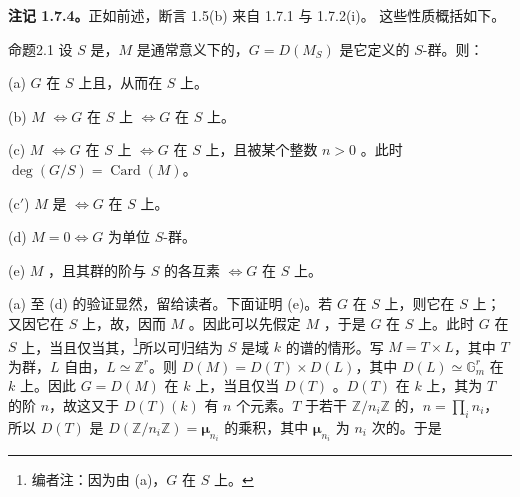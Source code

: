 \textbf{注记 1.7.4。}正如前述，断言 1.5(b) 来自 1.7.1 与 1.7.2(i)。
这些性质概括如下。
\begin{SGAresult}{命题}{2.1}
设 $S$ 是，$M$ 是通常意义下的，$G=D(M_S)$ 是它定义的 $S$-群。则：

(a) $G$ 在 $S$ 上且，从而在 $S$ 上。

(b) $M$  $\Longleftrightarrow G$ 在 $S$ 上 $\Longleftrightarrow G$ 在 $S$ 上。

(c) $M$  $\Longleftrightarrow G$ 在 $S$ 上 $\Longleftrightarrow G$ 在 $S$ 上，且被某个整数 $n>0$ 。此时 $\deg(G/S)=\operatorname{Card}(M)$。

(c$'$) $M$ 是 $\Longleftrightarrow G$ 在 $S$ 上。

(d) $M=0\Longleftrightarrow G$ 为单位 $S$-群。

(e) $M$ ，且其群的阶与 $S$ 的各互素 $\Longleftrightarrow G$ 在 $S$ 上。
\end{SGAresult}
(a) 至 (d) 的验证显然，留给读者。下面证明 (e)。若 $G$ 在 $S$ 上，则它在 $S$ 上；又因它在 $S$ 上，故，因而 $M$ 。因此可以先假定 $M$ ，于是 $G$ 在 $S$ 上。此时 $G$ 在 $S$ 上，当且仅当其，\footnote[11]{编者注：因为由 (a)，$G$ 在 $S$ 上。}所以可归结为 $S$ 是域 $k$ 的谱的情形。写 $M=T\times L$，其中 $T$ 为群，$L$ 自由，$L\simeq\mathbb Z^r$。则 $D(M)=D(T)\times D(L)$，其中 $D(L)\simeq\mathbb G_m^r$ 在 $k$ 上。因此 $G=D(M)$ 在 $k$ 上，当且仅当 $D(T)$ 。$D(T)$ 在 $k$ 上，其为 $T$ 的阶 $n$，故这又于 $D(T)(k)$ 有 $n$ 个元素。$T$ 于若干 $\mathbb Z/n_i\mathbb Z$ 的，$n=\prod_i n_i$，所以 $D(T)$ 是 $D(\mathbb Z/n_i\mathbb Z)=\boldsymbol\mu_{n_i}$ 的乘积，其中 $\boldsymbol\mu_{n_i}$ 为 $n_i$ 次的。于是

